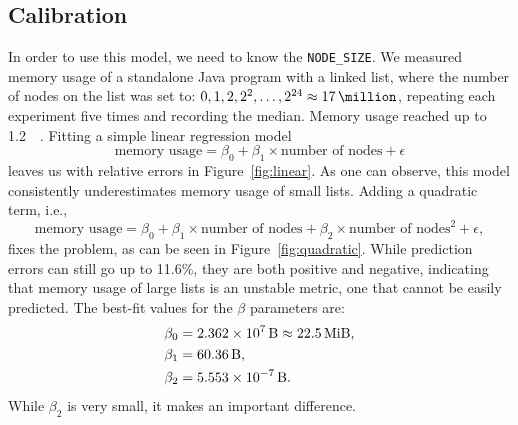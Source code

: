 \documentclass{article}
\begin{document}
\subsection{Calibration}

In order to use this model, we need to know the \texttt{NODE\_SIZE}. We measured
memory usage of a standalone Java program with a linked list, where the number
of nodes on the list was set to: $0, 1, 2, 2^2, \dots, 2^{24} \approx
\SI{17}{\million}$, repeating each experiment five times and recording the
median. Memory usage reached up to \SI{1.2}{\gibi\byte}. Fitting a simple linear
regression model
\[
  \text{memory usage} = \beta_0 + \beta_1 \times \text{number of nodes} +
  \epsilon
\]
leaves us with relative errors in Figure~\ref{fig:linear}. As one can observe,
this model consistently underestimates memory usage of small lists. Adding a
quadratic term, i.e.,
\[
  \text{memory usage} = \beta_0 + \beta_1 \times \text{number of nodes} +
  \beta_2 \times \text{number of nodes}^2 + \epsilon,
\]
fixes the problem, as can be seen in Figure~\ref{fig:quadratic}. While
prediction errors can still go up to 11.6\%, they are both positive and
negative, indicating that memory usage of large lists is an unstable metric, one
that cannot be easily predicted. The best-fit values for the $\beta$ parameters
are:
\begin{align*}
  \beta_0 &= \SI{2.362e7}{\byte} \approx \SI{22.5}{\mebi\byte}, \\
  \beta_1 &= \SI{60.36}{\byte}, \\
  \beta_2 &= \SI{5.553e-7}{\byte}.
\end{align*}
While $\beta_2$ is very small, it makes an important difference.

\end{document}

